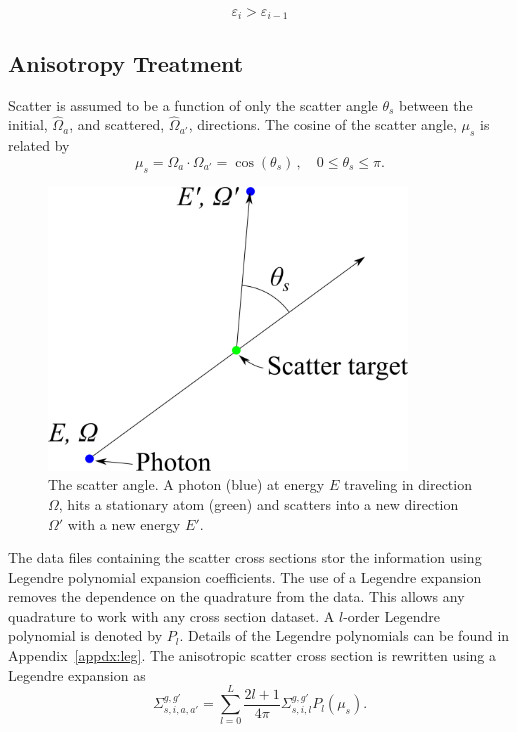 \begin{equation}\label{eq:conv4}
\varepsilon_i > \varepsilon_{i-1}
\end{equation}

\subsection{Anisotropy Treatment}

Scatter is assumed to be a function of only the scatter angle $\theta_s$ between the initial, $\hat{\Omega}_a$, and scattered, $\hat{\Omega}_{a'}$, directions. The cosine of the scatter angle, $\mu_s$ is related by 
\begin{equation} \label{eq:scat_cos}
\mu_s = \Omega_a \cdot \Omega_{a'} = \cos(\theta_s) \,, \quad 0 \leq \theta_s \leq \pi.
\end{equation}

\begin{figure}[tb]
  \begin{center}
   \includegraphics[width=3.75in]{figs/scat_ang}
  \end{center}
  \caption{The scatter angle. A photon (blue) at energy $E$ traveling in direction $\Omega$, hits a stationary atom (green) and scatters into a new direction $\Omega'$ with a new energy $E'$.}
\label{fig:scat_ang}
\end{figure}%

The data files containing the scatter cross sections stor the information using Legendre polynomial expansion coefficients. The use of a Legendre expansion removes the dependence on the quadrature from the data. This allows any quadrature to work with any cross section dataset. A $l$-order Legendre polynomial is denoted by $P_l$. Details of the Legendre polynomials can be found in Appendix~\ref{appdx:leg}. The anisotropic scatter cross section is rewritten using a Legendre expansion as
\begin{equation} \label{eq:leg_1}
\Sigma_{s, i, a, a'}^{g, g'} = \sum_{l=0}^L \frac{2l+1}{4 \pi}\Sigma_{s, i, l}^{g, g'} P_l(\mu_s).
\end{equation}


